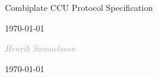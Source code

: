 \documentclass[]{scrartcl}
\newcommand{\code}[2][ForestGreen]{\textcolor{#1}{\textit{#2}}}
\begin{document}
\begin{titlepage}
	\raggedright
	\null\vspace{5cm}
	
	\noindent\hrulefill\par
	{\Huge\hspace{-0.3cm} Combiplate CCU Protocol Specification\par}
	\noindent\hrulefill\par
	
	{\Large\today\par}
	
	\vspace{0.7 cm}
	{\Large\code[darkgray]{Henrik Samuelsson}}
	
	


	



	\vfill

	{\large \today\par}
\end{titlepage}
\end{document}
